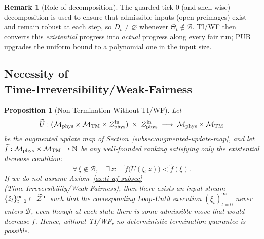 \documentclass[12pt]{article}
\theoremstyle{definition}
\newtheorem{remark}{Remark}[section]
\theoremstyle{plain}
\newtheorem{proposition}{Proposition}[section]
\begin{document}
\begin{remark}[Role of decomposition]
The guarded tick-0 (and shell-wise) decomposition is used to ensure that admissible inputs (open preimages) exist and remain robust at each step, so $D_t\neq\varnothing$ whenever $\Theta_t\notin\mathcal B$. TI/WF then converts this \emph{existential} progress into \emph{actual} progress along every fair run; PUB upgrades the uniform bound to a polynomial one in the input size.
\end{remark}



\subsection{Necessity of Time‑Irreversibility/Weak‑Fairness}
\label{subsec:augmented-no-fairness}

\begin{proposition}[Non‑Termination Without TI/WF]
\label{prop:augmented-nontermination}
Let 
\[
  \widetilde U : (\mathcal M_{\rm phys}\times\mathcal M_{\rm TM}\times\mathcal Z^{\rm in}_{\rm phys})
            \;\times\;\mathcal Z^{\rm in}_{\rm phys}
  \;\longrightarrow\;\mathcal M_{\rm phys}\times\mathcal M_{\rm TM}
\]
be the augmented update map of Section~\ref{subsec:augmented-update-map}, and let 
\(\widetilde f:\mathcal M_{\rm phys}\times\mathcal M_{\rm TM}\to\mathbb N\)
be any well‐founded ranking satisfying only the existential decrease condition:
\[
  \forall\,\xi\notin\mathcal B,\quad\exists\,z:\quad 
    \widetilde f\bigl(\widetilde U(\xi,z)\bigr)<\widetilde f(\xi).
\]
If we \emph{do not} assume Axiom~\ref{ax:ti-wf-subsec} (Time‑Irreversibility/Weak‑Fairness), then there exists an input stream
\(\{\tilde z_t\}_{t=0}^\infty\subset\widetilde{\mathcal Z}^{\rm in}\)
such that the corresponding Loop‑Until execution
\((\xi_t)_{t=0}^\infty\) never enters \(\mathcal B\), even though at each state there is some admissible move that would decrease \(\widetilde f\).  Hence, without TI/WF, no deterministic termination guarantee is possible.
\end{proposition}
\end{document}

